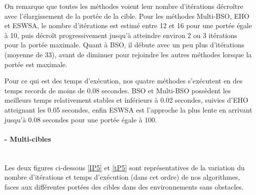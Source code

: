 	On remarque que toutes les méthodes voient leur nombre d'itérations décroître avec l'élargissement de la portée de la cible. Pour les méthodes Multi-BSO, EHO et ESWSA, le nombre d'itérations est estimé entre 12 et 16 pour une portée égale à 10, puis décroît progressivement jusqu'à atteindre environ 2 ou 3 itérations pour la portée maximale. Quant à BSO, il débute avec un peu plus d'itérations (moyenne de 33), avant de diminuer pour rejoindre les autres méthodes lorsque la portée est maximale.\\
	\vspace{-0.2cm}
	
	Pour ce qui est des temps d'exécution, nos quatre méthodes s'exécutent en des temps records de moins de 0.08 secondes. BSO et Multi-BSO possèdent les meilleurs temps relativement stables et inférieurs à 0.02 secondes, suivies d'EHO atteignant les 0.05 secondes, enfin ESWSA est l'approche la plus lente en arrivant jusqu'à 0.08 secondes pour une portée égale à 100.
	
	\noindent
	\hspace{-0.5cm}
	\begin{minipage}[t]{0.55\textwidth}
		\captionsetup{width=0.8\linewidth}
		\centering{}
		\label{IP1}
	\end{minipage}\hfill
	\hspace{-0.5cm}
	\begin{minipage}[t]{0.55\textwidth}
		\captionsetup{width=0.8\linewidth}
		\centering{}
		\label{tP1}
	\end{minipage}\hfill
	
	\paragraph{- Multi-cibles}
	\textbf{ }\\
	Les deux figures ci-dessous \ref{IP5} et \ref{tP5} sont représentatives de la variation du nombre d'itérations et temps d'exécution (dans cet ordre) de nos algorithmes, faces aux différentes portées des cibles dans des environnements sans obstacles.\\
	
